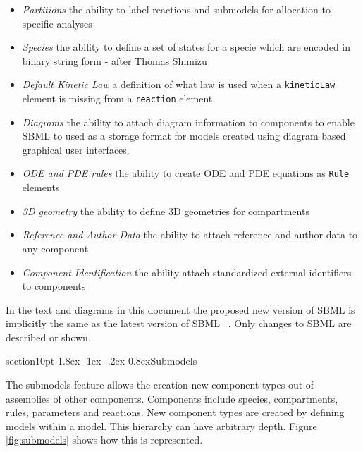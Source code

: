 \documentclass[10pt]{article}
\makeatletter
\renewcommand{\section}{\@startsection%
  {section}{1}{0pt}{-1.8ex \@plus -1ex \@minus -.2ex}%
  {0.8ex}{\normalfont\Large\bfseries\sffamily}}
\newcommand{\class}[1]{\texttt{#1}}
\makeatother
\begin{document}
\begin{itemize}

\item \emph{Partitions} the ability to label reactions and submodels for allocation to specific analyses

\item \emph{Species} the ability to define a set of states for a specie which are encoded in binary string form - after Thomas Shimizu

\item \emph{Default Kinetic Law} a definition of what law is used when a \class{kineticLaw} element is missing from a \class{reaction} element.

\item \emph{Diagrams} the ability to attach diagram information to components to enable SBML to used as a storage format for models
created using diagram based graphical user interfaces.

\item \emph{ODE and PDE rules} the ability to create ODE and PDE equations as \class{Rule} elements

\item \emph{3D geometry} the ability to define 3D geometries for compartments

\item \emph{Reference and Author Data} the ability to attach reference and author data to any component

\item \emph{Component Identification} the ability attach standardized external identifiers to components

\end{itemize}

In the text and diagrams in this document the proposed new
version of SBML is implicitly the same as the latest
version of SBML ~\cite{Finney:SBMLv1}.  Only changes to SBML are described or
shown.

\section{Submodels}

\label{sec:submodels}

The submodels feature allows the creation new component types out
of assemblies of other components. Components include species,
compartments, rules, parameters and reactions. New component
types are created by defining models within a model.  This
hierarchy can have arbitrary depth. Figure \ref{fig:submodels}
shows how this is represented.
\end{document}
